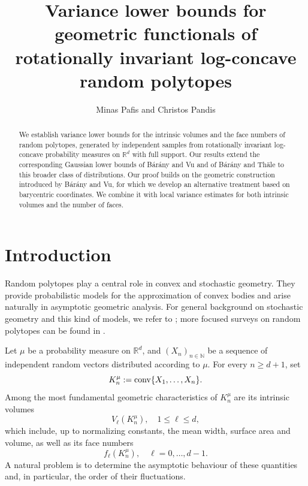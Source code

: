 \documentclass[10pt]{amsart}
\title{ \bf Variance lower bounds for geometric functionals of rotationally invariant log-concave random polytopes}
\author{Minas Pafis and Christos Pandis}
\date{}
\newcommand{\1}{\textbf{1}}
\newcommand{\conv}{{\rm conv}}
\numberwithin{equation}{section} %
\theoremstyle{remark}
\theoremstyle{definition}
\begin{document}
\begin{abstract}\footnotesize
We establish variance lower bounds for the intrinsic volumes and the face numbers of random polytopes, generated by independent samples from rotationally invariant log-concave probability measures on $\mathbb{R}^d$ with full support. Our results extend the corresponding Gaussian lower bounds of B\'ar\'any and Vu and of B\'ar\'any and Th\"ale to this broader class of distributions. Our proof builds on the geometric construction introduced by B\'ar\'any and Vu, for which we develop an alternative treatment based on barycentric coordinates. We combine it with local variance estimates for both intrinsic volumes and the number of faces.
\end{abstract}

\maketitle

\section{Introduction}

Random polytopes play a central role in convex and stochastic geometry. They
provide probabilistic models for the approximation of convex bodies and arise
naturally in asymptotic geometric analysis. For general background on
stochastic geometry and this kind of models, we refer to
\cite{SchneiderWeil2008,WeilWieacker1993}; more focused surveys on random
polytopes can be found in \cite{Barany2008,Hug2013,Reitzner2010}.

Let $\mu$ be a
probability measure on $\mathbb{R}^d$, and $(X_n)_{n \in \mathbb{N}}$ be a sequence of independent
random vectors distributed according to $\mu$. For every $n \geq d+1$, set
\[
    K_n^\mu:=\conv\{X_1,\ldots,X_n\}.
\]
Among the most fundamental geometric characteristics of $K_n^\mu$ are its
intrinsic volumes
\[
    V_\ell(K_n^\mu), \quad 1\leq \ell\leq d,
\]
which include, up to normalizing constants, the mean width, surface area and volume, as well as its face numbers \[f_\ell(K_n^\mu), \quad \ell=0,\ldots,d-1.\] A natural problem is to determine the asymptotic behaviour of these
quantities and, in particular, the order of their fluctuations.
\end{document}
